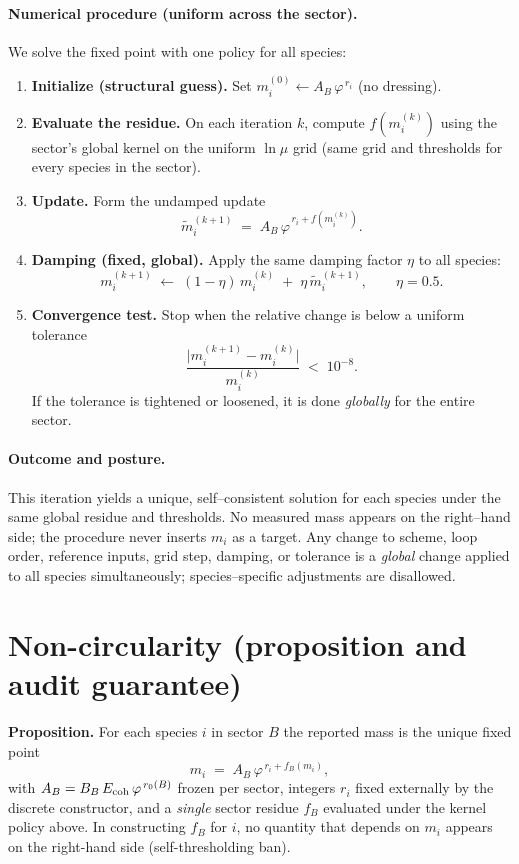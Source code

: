 \documentclass[epjc3]{svjour3}
\begin{document}
\paragraph{Numerical procedure (uniform across the sector).}
We solve the fixed point with one policy for all species:
\begin{enumerate}
  \item \textbf{Initialize (structural guess).} Set $m_i^{(0)} \gets A_B\,\varphi^{\,r_i}$ (no dressing).
  \item \textbf{Evaluate the residue.} On each iteration $k$, compute $f(m_i^{(k)})$ using the sector’s global kernel on the uniform $\ln\mu$ grid (same grid and thresholds for every species in the sector).
  \item \textbf{Update.} Form the undamped update
  \[
  \tilde m_i^{(k+1)} \;=\; A_B\,\varphi^{\,r_i + f(m_i^{(k)})}.
  \]
  \item \textbf{Damping (fixed, global).} Apply the same damping factor $\eta$ to all species:
  \[
  m_i^{(k+1)} \;\gets\; (1-\eta)\,m_i^{(k)} \;+\; \eta\,\tilde m_i^{(k+1)},\qquad \eta=0.5.
  \]
  \item \textbf{Convergence test.} Stop when the relative change is below a uniform tolerance
  \[
  \frac{\bigl|m_i^{(k+1)}-m_i^{(k)}\bigr|}{m_i^{(k)}} \;<\; 10^{-8}.
  \]
  If the tolerance is tightened or loosened, it is done \emph{globally} for the entire sector.
\end{enumerate}

\paragraph{Outcome and posture.}
This iteration yields a unique, self–consistent solution for each species under the same global residue and thresholds. No measured mass appears on the right–hand side; the procedure never inserts $m_i$ as a target. Any change to scheme, loop order, reference inputs, grid step, damping, or tolerance is a \emph{global} change applied to all species simultaneously; species–specific adjustments are disallowed.

\section*{Non-circularity (proposition and audit guarantee)}
\textbf{Proposition.} For each species $i$ in sector $B$ the reported mass is the unique fixed point
\[
m_i \;=\; A_B\,\varphi^{\,r_i+f_B(m_i)},
\]
with $A_B=B_B\,E_{\rm coh}\,\varphi^{\,r_0(B)}$ frozen per sector, integers $r_i$ fixed externally by the discrete constructor, and a \emph{single} sector residue $f_B$ evaluated under the kernel policy above. In constructing $f_B$ for $i$, no quantity that depends on $m_i$ appears on the right-hand side (self-thresholding ban).
\end{document}
